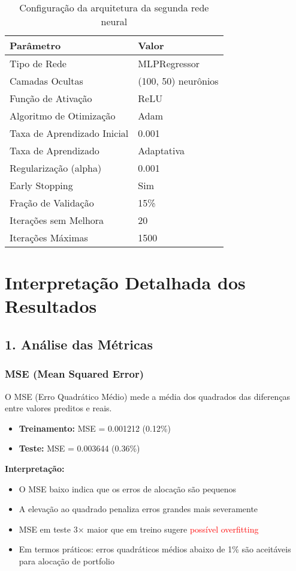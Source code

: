 \documentclass[12pt]{article}
\begin{document}
\begin{table}[h!]
\centering
\caption{Configuração da arquitetura da segunda rede neural}
\label{tab:arquitetura_segunda_rede}
\begin{tabular}{ll}
\toprule
\textbf{Parâmetro} & \textbf{Valor} \\
\midrule
Tipo de Rede & MLPRegressor \\
Camadas Ocultas & (100, 50) neurônios \\
Função de Ativação & ReLU \\
Algoritmo de Otimização & Adam \\
Taxa de Aprendizado Inicial & 0.001 \\
Taxa de Aprendizado & Adaptativa \\
Regularização (alpha) & 0.001 \\
Early Stopping & Sim \\
Fração de Validação & 15\% \\
Iterações sem Melhora & 20 \\
Iterações Máximas & 1500 \\
\bottomrule
\end{tabular}
\end{table}

\newpage

\section*{Interpretação Detalhada dos Resultados}

\subsection*{1. Análise das Métricas}

\subsubsection*{MSE (Mean Squared Error)}

O MSE (Erro Quadrático Médio) mede a média dos quadrados das diferenças entre valores preditos e reais.

\begin{itemize}
    \item \textbf{Treinamento:} MSE = 0.001212 (0.12\%)
    \item \textbf{Teste:} MSE = 0.003644 (0.36\%)
\end{itemize}

\textbf{Interpretação:}
\begin{itemize}
    \item O MSE baixo indica que os erros de alocação são pequenos
    \item A elevação ao quadrado penaliza erros grandes mais severamente
    \item MSE em teste 3× maior que em treino sugere \textcolor{red}{possível overfitting}
    \item Em termos práticos: erros quadráticos médios abaixo de 1\% são aceitáveis para alocação de portfolio
\end{itemize}
\end{document}
